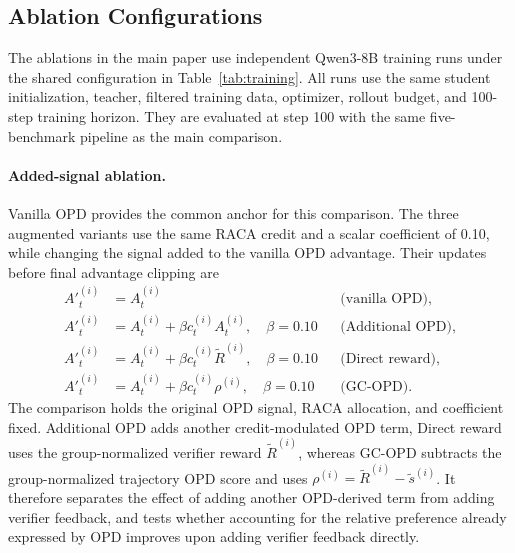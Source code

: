 \subsection{Ablation Configurations}
\label{sec:ablation-configurations}

The ablations in the main paper use independent Qwen3-8B training runs under
the shared configuration in Table~\ref{tab:training}. All runs use the same
student initialization, teacher, filtered training data, optimizer, rollout
budget, and 100-step training horizon. They are evaluated at step 100 with the
same five-benchmark pipeline as the main comparison.

\paragraph{Added-signal ablation.}
Vanilla OPD provides the common anchor for this comparison. The three augmented
variants use the same RACA credit and a scalar coefficient of 0.10, while
changing the signal added to the vanilla OPD advantage. Their updates before
final advantage clipping are
\begin{align}
A'^{(i)}_t&=A^{(i)}_t
&&\text{(vanilla OPD)},\\
A'^{(i)}_t&=A^{(i)}_t+\beta c^{(i)}_tA^{(i)}_t,
\quad \beta=0.10
&&\text{(Additional OPD)},\\
A'^{(i)}_t&=A^{(i)}_t+\beta c^{(i)}_t\tilde{R}^{(i)},
\quad \beta=0.10
&&\text{(Direct reward)},\\
A'^{(i)}_t&=A^{(i)}_t+\beta c^{(i)}_t\rho^{(i)},
\quad \beta=0.10
&&\text{(GC-OPD)}.
\end{align}
The comparison holds the original OPD signal, RACA allocation, and coefficient
fixed. Additional OPD adds another credit-modulated OPD term, Direct reward uses the group-normalized verifier reward
$\tilde{R}^{(i)}$, whereas GC-OPD subtracts the group-normalized trajectory
OPD score and uses $\rho^{(i)}=\tilde{R}^{(i)}-\tilde{s}^{(i)}$. It
therefore separates the effect of adding another OPD-derived term from adding verifier feedback, and tests whether accounting for the relative preference already expressed by OPD improves upon adding verifier feedback directly.

